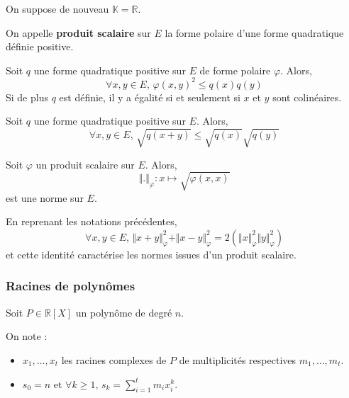   On suppose de nouveau $\mathbb{K} = \mathbb{R}$.


  \begin{definition}
    On appelle \textbf{produit scalaire} sur $E$ la forme polaire d'une forme quadratique définie positive.
  \end{definition}


  \begin{proposition}
    Soit $q$ une forme quadratique positive sur $E$ de forme polaire $\varphi$. Alors,
    \[ \forall x, y \in E, \, \varphi(x, y)^2 \leq q(x) q(y) \]
    Si de plus $q$ est définie, il y a égalité si et seulement si $x$ et $y$ sont colinéaires.
  \end{proposition}

  \begin{proposition}
    Soit $q$ une forme quadratique positive sur $E$. Alors,
    \[ \forall x, y \in E, \, \sqrt{q(x + y)} \leq \sqrt{q(x)} \sqrt{q(y)} \]
  \end{proposition}

  \begin{corollary}
    Soit $\varphi$ un produit scalaire sur $E$. Alors,
    \[ \Vert . \Vert_{\varphi} : x \mapsto \sqrt{\varphi(x, x)} \]
    est une norme sur $E$.
  \end{corollary}


  \begin{proposition}
    En reprenant les notations précédentes,
    \[ \forall x, y \in E, \, \Vert x + y \Vert_{\varphi}^2 + \Vert x - y \Vert_{\varphi}^2 = 2(\Vert x \Vert_{\varphi}^2 \Vert y \Vert_{\varphi}^2) \]
    et cette identité caractérise les normes issues d'un produit scalaire.
  \end{proposition}

  \subsubsection{Racines de polynômes}


  Soit $P \in \mathbb{R}[X]$ un polynôme de degré $n$.

  \begin{notation}
    On note :
    \begin{itemize}
      \item $x_1, \dots, x_t$ les racines complexes de $P$ de multiplicités respectives $m_1, \dots, m_t$.
      \item $s_0 = n \text{ et } \forall k \geq 1, \, s_k = \sum_{i=1}^t m_i x_i^k$.
    \end{itemize}
  \end{notation}

